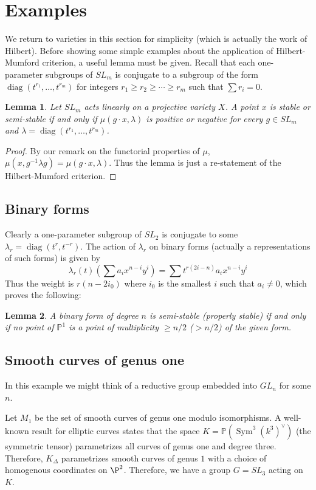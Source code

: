 \documentclass[12pt]{article}
\newtheorem{lemma}{Lemma}[section]
\theoremstyle{remark}
\theoremstyle{definition}
\newcommand{\D}[0]{\Delta}
\newcommand{\Sym}[0]{\operatorname{Sym}}
\begin{document}
    \section{Examples}
    We return to varieties in this section for simplicity (which is actually the work of Hilbert). Before showing some simple examples about the application of Hilbert-Mumford criterion, a useful lemma must be given. Recall that each one-parameter subgroups of $SL_m$ is conjugate to a subgroup of the form $\operatorname{diag}(t^{r_1},\dots, t^{r_m})$ for integers $r_1\geqslant r_2\geqslant\cdots\geqslant r_m$ such that $\sum r_i=0$.
    \begin{lemma}
        Let $SL_m$ acts linearly on a projective variety $X$. A point $x$ is stable or semi-stable if and only if $\mu(g\cdot x,\lambda)$ is positive or negative for every $g\in SL_m$ and $\lambda=\operatorname{diag}(t^{r_1},\dots, t^{r_m})$.
    \end{lemma}
    \begin{proof}
        By our remark on the functorial properties of $\mu$, $\mu(x,g^{-1}\lambda g)=\mu(g\cdot x,\lambda)$. Thus the lemma is just a re-statement of the Hilbert-Mumford criterion.
    \end{proof}
    \subsection{Binary forms}
    Clearly a one-parameter subgroup of $SL_2$ is conjugate to some $\lambda_r=\operatorname{diag}(t^r,t^{-r})$. The action of $\lambda_r$ on binary forms (actually a representations of such forms) is given by
    \[\lambda_r(t)\left(\sum a_ix^{n-i}y^i\right)=\sum t^{r(2i-n)}a_ix^{n-i}y^i\]
    Thus the weight is $r(n-2i_0)$ where $i_0$ is the smallest $i$ such that $a_i\neq 0$, which proves the following:
    \begin{lemma}
        A binary form of degree $n$ is semi-stable (properly stable) if and only if no point of $\mathbb P^1$ is a point of multiplicity $\geqslant n/2$ ($>n/2$) of the given form.
    \end{lemma}
    \subsection{Smooth curves of genus one}
    In this example we might think of a reductive group embedded into $GL_n$ for some $n$.

    Let $M_1$ be the set of smooth curves of genus one modulo isomorphisms. A well-known result for elliptic curves states that the space $K=\mathbb P(\Sym^3(k^3)^\vee)$ (the symmetric tensor) parametrizes all curves of genus one and degree three. Therefore, $K_\D$ parametrizes smooth curves of genus $1$ with a choice of homogenous coordinates on $\P^2$. Therefore, we have a group $G=SL_3$ acting on $K$.
\end{document}
